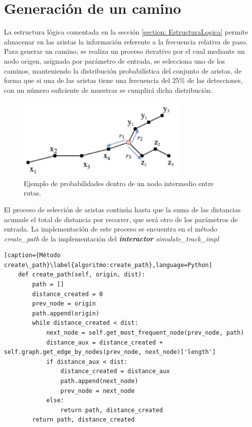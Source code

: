 \section{Generación de un camino}

La estructura lógica comentada en la sección \ref{section: EstructuraLogica} permite 
almacenar en las aristas la información referente a la frecuencia relativa de paso.
Para generar un camino, se realiza un proceso iterativo por el cual mediante un nodo origen, 
asignado por parámetro de entrada, se selecciona uno de los caminos, manteniendo la 
distribución probabilística del conjunto de aristas, de forma que si una de las aristas tiene una 
frecuencia del 25\% de las detecciones, con un número suficiente de muestras se cumplirá dicha 
distribución. 
\begin{figure}[!htb]
\begin{center}
\includegraphics[width=0.75\textwidth]{./Imagenes/SimulationProbabilities.png}
\caption{Ejemplo de probabilidades dentro de un nodo intermedio entre rutas.}
\label{figure:PointGeneration02}
\end{center}
\end{figure}

El proceso de selección de aristas continúa hasta que la suma de las distancias 
acumule el total de distancia por recorrer, que será otro de los parámetros de entrada.
La implementación de este proceso se encuentra en el método \textit{create\_path} de la 
implementación del \textbf{\textit{interactor}} \textit{simulate\_track\_impl}

\begin{lstlisting}[caption={Método create\_path}\label{algoritmo:create_path},language=Python] 
    def create_path(self, origin, dist):
        path = []
        distance_created = 0
        prev_node = origin
        path.append(origin)
        while distance_created < dist:
            next_node = self.get_most_frequent_node(prev_node, path)
            distance_aux = distance_created + self.graph.get_edge_by_nodes(prev_node, next_node)['length']
            if distance_aux < dist:
                distance_created = distance_aux
                path.append(next_node)
                prev_node = next_node
            else:
                return path, distance_created
        return path, distance_created
\end{lstlisting}

